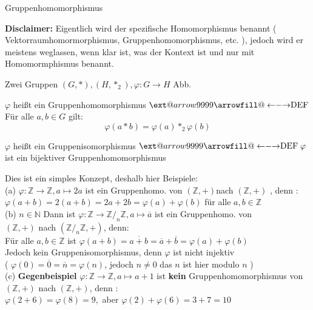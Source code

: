 \documentclass[smallheadings,12pt,a4paper]{scrartcl}
\makeatletter
\newcommand\xleftrightarrow[2][]{%
  \ext@arrow 9999{\longleftrightarrowfill@}{#1}{#2}}
\newcommand\longleftrightarrowfill@{%
  \arrowfill@\leftarrow\relbar\rightarrow}
\makeatother
\begin{document}
\begin{center}
\item[Gruppenhomomorphismus]
\end{center}
\item \textbf{Disclaimer:} Eigentlich wird der spezifische Homomorphismus benannt ( Vektorraumhomormorphismus, Gruppenhomomorphismus, etc. ), jedoch wird er meistens weglassen, wenn klar ist, was der Kontext ist und nur mit Homomormphismus benannt. \\
\item Zwei Gruppen $(G,*), (H,*_2) , \varphi: G\rightarrow H $ Abb.
\item  $\varphi$  heißt ein Gruppenhomomorphismus $ \xleftrightarrow{\text{DEF}} $ Für alle $a,b \in G $ gilt: 
$$ \varphi(a*b) = \varphi(a) *_2 \varphi(b) $$
\item  $\varphi$  heißt ein Gruppenisomorphismus $ \xleftrightarrow{\text{DEF}} \; \varphi $ ist ein bijektiver Gruppenhomomorphismus 
\item Dies ist ein simples Konzept, deshalb hier Beispiele:  \\
(a) $ \varphi : \mathbb{Z} \rightarrow \mathbb{Z} , a \mapsto 2a $ ist ein Gruppenhomo. von $(\mathbb{Z}, + ) $nach $(\mathbb{Z}, + ) $ , denn : \\
$\varphi(a+b) = 2 (a+b) = 2a + 2b = \varphi (a) + \varphi (b) $ für alle $ a,b \in \mathbb{Z} $ \\

(b) $ n \in \mathbb{N} $ Dann ist $ \varphi : \mathbb{Z} \rightarrow \mathbb{Z} /_n \mathbb{Z} , a \mapsto \overline{a} $ ist ein Gruppenhomo. von \\
$( \mathbb{Z}, + ) $ nach  $(\mathbb{Z} /_n \mathbb{Z},+)$, denn: \\
Für alle $a,b \in \mathbb{Z} $ ist $ \varphi(a+b) = \overline{a+b} = \overline{a} + \overline{b} = \varphi(a) + \varphi (b) $ \\
Jedoch kein Gruppenisomorphismus, denn $ \varphi $ ist nicht injektiv \\
( $ \varphi(0) = \overline{0} = \overline{n} = \varphi(n) $, jedoch $ n \neq 0 $ das $n$ ist hier modulo $n$ ) \\
 
(c) \textbf{Gegenbeispiel} $ \varphi: \mathbb{Z} \rightarrow \mathbb{Z} , a \mapsto a+1 $ ist \textbf{kein} Gruppenhomomorphismus von \\
$(\mathbb{Z},+)$ nach $( \mathbb{Z}, + )$, denn : \\
$ \varphi(2+6) = \varphi(8) = 9 , $ aber $ \varphi(2)+ \varphi(6) = 3+7=10 $
\end{document}
